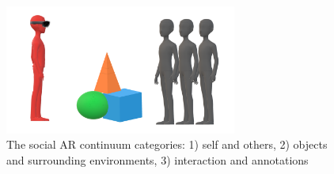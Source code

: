 \begin{figure}
    \centering
    \includegraphics[width=3in]{images/continuum_categories5.png}
    \caption{The social AR continuum categories: 1) self and others, 2) objects and surrounding environments, 3) interaction and annotations}
    \label{fig:continuum:categories}
\end{figure}





